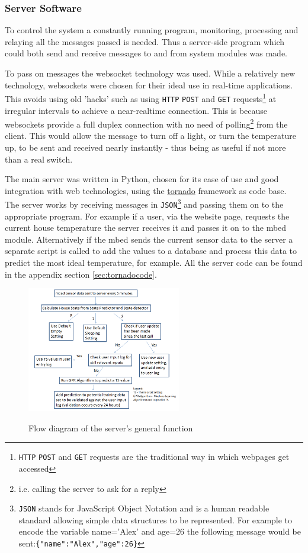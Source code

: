 \documentclass[10.5pt,a4paper,twoside]{report}   %
\begin{document}
\subsubsection{Server Software}
To control the system a constantly running program, monitoring, processing and relaying all the messages passed is needed. Thus a server-side program which could both send and receive messages to and from system modules was made.

To pass on messages the websocket technology was used. While a relatively new technology, websockets were chosen for their ideal use in real-time applications. This avoids using old 'hacks' such as using \verb+HTTP+ \verb+POST+ and \verb+GET+ requests\footnote{\verb+HTTP+ \verb+POST+ and \verb+GET+ requests are the traditional way in which webpages get accessed} at irregular intervals to achieve a near-realtime connection. This is because websockets provide a full duplex connection with no need of polling\footnote{i.e. calling the server to ask for a reply} from the client. This would allow the message to turn off a light, or turn the temperature up, to be sent and received nearly instantly - thus being as useful if not more than a real switch.

The main server was written in Python, chosen for its ease of use and good integration with web technologies, using the \href{http://www.tornadoweb.org}{tornado} framework as code base. The server works by receiving messages in \verb+JSON+\footnote{\verb+JSON+ stands for JavaScript Object Notation and is a human readable standard allowing simple data structures to be represented. For example to encode the variable name='Alex' and age=26 the following message would be sent:\verb+{"name":"Alex","age":26}+} and passing them on to the appropriate program. For example if a user, via the website page, requests the current house temperature the server receives it and passes it on to the mbed module. Alternatively if the mbed sends the current sensor data to the server a separate script is called to add the values to a database and process this data to predict the most ideal temperature, for example. All the server code can be found in the appendix section \ref{sec:tornadocode}.

\begin{figure}[h!]
  \vspace{-10pt}
  \caption{Flow diagram of the server's general function}
  \centering
    \includegraphics[width=0.6\textwidth]{images/system_overview.png}
\label{fig:sysoverview}
  \vspace{-10pt}
\end{figure}
\FloatBarrier
\end{document}
